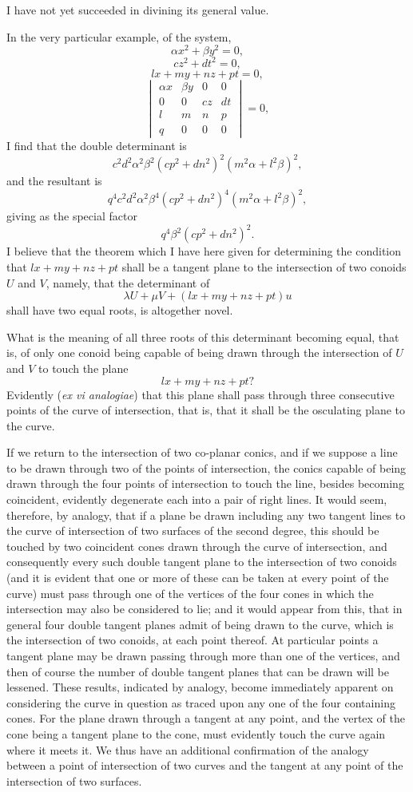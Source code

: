 \documentclass[11pt]{article}
\newcommand{\sourcepage}[1]{\marginpar{\scriptsize p.~#1}}
\begin{document}
{{I have not yet succeeded in divining its general value.

In the very particular example, of the system,
\[
\alpha x^2+\beta y^2=0,
\]
\[
cz^2+dt^2=0,
\]
\[
lx+my+nz+pt=0,
\]
\[
\begin{vmatrix}
\alpha x&\beta y&0&0\\
0&0&cz&dt\\
l&m&n&p\\
q&0&0&0
\end{vmatrix}=0,
\]
I find that the double determinant is
\[
c^2d^2\alpha^2\beta^2(cp^2+dn^2)^2(m^2\alpha+l^2\beta)^2,
\]
and the resultant is
\[
q^4c^2d^2\alpha^2\beta^4(cp^2+dn^2)^4(m^2\alpha+l^2\beta)^2,
\]
giving as the special factor
\[
q^4\beta^2(cp^2+dn^2)^2.
\]
I believe that the theorem which I have here given for determining the condition that $lx+my+nz+pt$ shall be a tangent plane to the intersection of two conoids $U$ and $V$, namely, that the determinant of
\[
\lambda U+\mu V+(lx+my+nz+pt)u
\]
shall have two equal roots, is altogether novel.

\sourcepage{144}
What is the meaning of all three roots of this determinant becoming equal, that is, of only one conoid being capable of being drawn through the intersection of $U$ and $V$ to touch the plane
\[
lx+my+nz+pt?
\]
Evidently (\emph{ex vi analogiae}) that this plane shall pass through three consecutive points of the curve of intersection, that is, that it shall be the osculating plane to the curve.

If we return to the intersection of two co-planar conics, and if we suppose a line to be drawn through two of the points of intersection, the conics capable of being drawn through the four points of intersection to touch the line, besides becoming coincident, evidently degenerate each into a pair of right lines. It would seem, therefore, by analogy, that if a plane be drawn including any two tangent lines to the curve of intersection of two surfaces of the second degree, this should be touched by two coincident cones drawn through the curve of intersection, and consequently every such double tangent plane to the intersection of two conoids (and it is evident that one or more of these can be taken at every point of the curve) must pass through one of the vertices of the four cones in which the intersection may also be considered to lie; and it would appear from this, that in general four double tangent planes admit of being drawn to the curve, which is the intersection of two conoids, at each point thereof. At particular points a tangent plane may be drawn passing through more than one of the vertices, and then of course the number of double tangent planes that can be drawn will be lessened. These results, indicated by analogy, become immediately apparent on considering the curve in question as traced upon any one of the four containing cones. For the plane drawn through a tangent at any point, and the vertex of the cone being a tangent plane to the cone, must evidently touch the curve again where it meets it. We thus have an additional confirmation of the analogy between a point of intersection of two curves and the tangent at any point of the intersection of two surfaces.

}}
\end{document}
